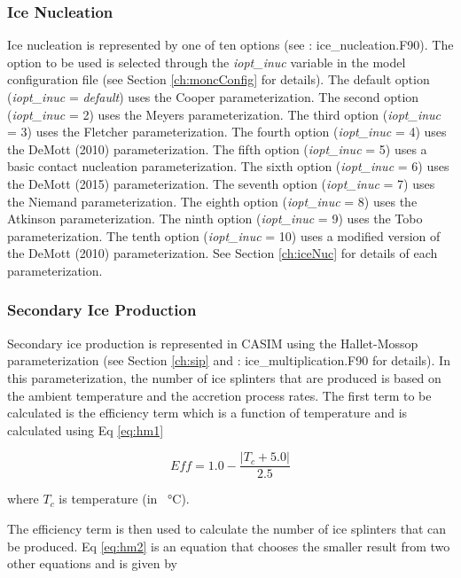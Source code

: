 \subsubsection{Ice Nucleation}
Ice nucleation is represented by one of ten options (see \cite{casimCode}: ice\_nucleation.F90). The option to be used is selected through the \textit{iopt\_inuc} variable in the model configuration file (see Section \ref{ch:moncConfig} for details). The default option (\textit{iopt\_inuc} = \textit{default}) uses the Cooper parameterization. The second option (\textit{iopt\_inuc} = 2) uses the Meyers parameterization. The third option (\textit{iopt\_inuc} = 3) uses the Fletcher parameterization. The fourth option (\textit{iopt\_inuc} = 4) uses the DeMott (2010) parameterization. The fifth option (\textit{iopt\_inuc} = 5) uses a basic contact nucleation parameterization. The sixth option (\textit{iopt\_inuc} = 6) uses the DeMott (2015) parameterization. The seventh option (\textit{iopt\_inuc} = 7) uses the Niemand parameterization. The eighth option (\textit{iopt\_inuc} = 8) uses the Atkinson parameterization. The ninth option (\textit{iopt\_inuc} = 9) uses the Tobo parameterization. The tenth option (\textit{iopt\_inuc} = 10) uses a modified version of the DeMott (2010) parameterization. See Section \ref{ch:iceNuc} for details of each parameterization.

\subsubsection{Secondary Ice Production}
Secondary ice production is represented in CASIM using the Hallet-Mossop parameterization (see Section \ref{ch:sip} and \cite{casimCode}: ice\_multiplication.F90 for details). In this parameterization, the number of ice splinters that are produced is based on the ambient temperature and the accretion process rates. The first term to be calculated is the efficiency term which is a function of temperature and is calculated using Eq \ref{eq:hm1}

\begin{equation} \label{eq:hm1}
Eff = 1.0 - \frac{\lvert T_c +5.0 \rvert }{2.5}
\end{equation}

where $T_c$ is temperature (in \SI{}{\degreeCelsius}).

The efficiency term is then used to calculate the number of ice splinters that can be produced. Eq \ref{eq:hm2} is an equation that chooses the smaller result from two other equations and is given by

